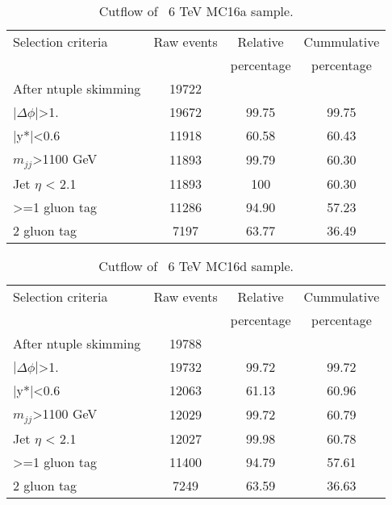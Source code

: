 \begin{table}[ht]
\begin{center}
\begin{tabular}{|l|c|c|c|}
\hline
Selection criteria & Raw events &  Relative & Cummulative \\
 & & percentage & percentage \\
\hline
After ntuple skimming & 19722 &  &  \\
$|\Delta\phi|$>1. & 19672 & 99.75 & 99.75 \\
|y*|<0.6 & 11918 & 60.58 & 60.43 \\
$m_{jj}$>1100 GeV & 11893 & 99.79 & 60.30 \\
Jet $\eta$ < 2.1 & 11893 & 100 & 60.30 \\
>=1 gluon tag & 11286 & 94.90 & 57.23 \\
2 gluon tag & 7197 & 63.77 & 36.49 \\
\hline
\end{tabular}
\end{center}
\caption{Cutflow of \Hprime\ 6 TeV MC16a sample.}
\end{table}

\begin{table}[ht]
\begin{center}
\begin{tabular}{|l|c|c|c|}
\hline
Selection criteria & Raw events &  Relative & Cummulative \\
 & & percentage & percentage \\
\hline
After ntuple skimming & 19788 &  &  \\
$|\Delta\phi|$>1. & 19732 & 99.72 & 99.72 \\
|y*|<0.6 & 12063 & 61.13 & 60.96 \\
$m_{jj}$>1100 GeV & 12029 & 99.72 & 60.79 \\
Jet $\eta$ < 2.1 & 12027 & 99.98 & 60.78 \\
>=1 gluon tag & 11400 & 94.79 & 57.61 \\
2 gluon tag & 7249 & 63.59 & 36.63 \\
\hline
\end{tabular}
\end{center}
\caption{Cutflow of \Hprime\ 6 TeV MC16d sample.}
\end{table}

